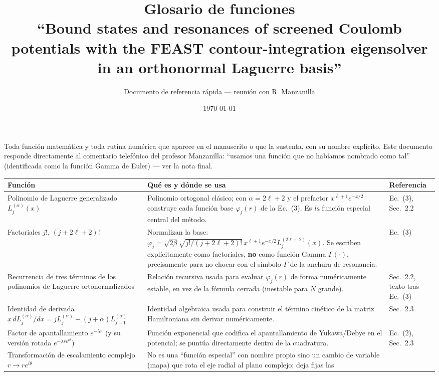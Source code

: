 \documentclass[11pt]{article}
\title{Glosario de funciones\\
\large ``Bound states and resonances of screened Coulomb potentials with
the FEAST contour-integration eigensolver in an orthonormal Laguerre
basis''}
\author{Documento de referencia r\'apida --- reuni\'on con R. Manzanilla}
\date{\today}
\begin{document}
\maketitle
\noindent Toda funci\'on matem\'atica y toda rutina num\'erica que aparece
en el manuscrito o que la sustenta, con su nombre expl\'icito. Este
documento responde directamente al comentario telef\'onico del profesor
Manzanilla: ``usamos una funci\'on que no hab\'iamos nombrado como tal''
(identificada como la funci\'on Gamma de Euler) --- ver la nota final.

\begingroup
\footnotesize
\begin{longtable}{@{}L{4.4cm}L{9.2cm}L{2.8cm}@{}}
\toprule
Funci\'on & Qu\'e es y d\'onde se usa & Referencia \\
\midrule
\endhead
Polinomio de Laguerre generalizado $L_j^{(\alpha)}(x)$ & Polinomio
  ortogonal cl\'asico; con $\alpha=2\ell+2$ y el prefactor
  $x^{\ell+1}e^{-x/2}$ construye cada funci\'on base $\varphi_j(r)$ de la
  Ec.~(3). Es \emph{la} funci\'on especial central del m\'etodo. &
  Ec.~(3), Sec.~2.2 \\
Factoriales $j!$, $(j+2\ell+2)!$ & Normalizan la base:
  $\varphi_j=\sqrt{2\beta}\sqrt{j!/(j+2\ell+2)!}\,x^{\ell+1}e^{-x/2}L_j^{(2\ell+2)}(x)$.
  Se escriben expl\'icitamente como factoriales, \textbf{no} como funci\'on
  Gamma $\Gamma(\cdot)$, precisamente para no chocar con el s\'imbolo
  $\Gamma$ de la anchura de resonancia. & Ec.~(3) \\
Recurrencia de tres t\'erminos de los polinomios de Laguerre
  ortonormalizados & Relaci\'on recursiva usada para evaluar $\varphi_j(r)$
  de forma num\'ericamente estable, en vez de la f\'ormula cerrada
  (inestable para $N$ grande). & Sec.~2.2, texto tras Ec.~(3) \\
Identidad de derivada
  $x\,dL_j^{(\alpha)}/dx = jL_j^{(\alpha)}-(j+\alpha)L_{j-1}^{(\alpha)}$ &
  Identidad algebraica usada para construir el t\'ermino cin\'etico de la
  matriz Hamiltoniana sin derivar num\'ericamente. & Sec.~2.3 \\
Factor de apantallamiento $e^{-\lambda r}$ (y su versi\'on rotada
  $e^{-\lambda r e^{i\theta}}$) & Funci\'on exponencial que codifica el
  apantallamiento de Yukawa/Debye en el potencial; se punt\'ua directamente
  dentro de la cuadratura. & Ec.~(2), Sec.~2.3 \\
Transformaci\'on de escalamiento complejo $r\to re^{i\theta}$ & No es una
  ``funci\'on especial'' con nombre propio sino un cambio de variable
  (mapa) que rota el eje radial al plano complejo; deja fijas las

\end{longtable}
\end{document}
